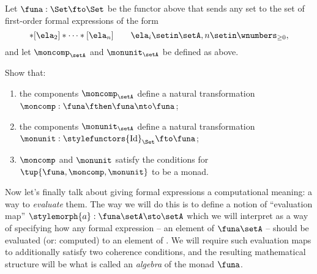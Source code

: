 \begin{gradedexercise}
    \label{ex:ListMonad}
    Let $\funa : \Set \fto \Set$ be the functor above that sends any set \setA to the set of first-order formal expressions of the form
    \begin{equation}
        [\ela_1]
        * [\ela_2] * \cdots * [\ela_n] \quad \quad \ela_i \setin \setA, n \setin \wnumbers_{\geq 0},
    \end{equation}
    and let $\moncomp_\setA$ and $\monunit_\setA$ be defined as above.

    Show that:
    \begin{enumerate}
        \item the components $\moncomp_\setA$ define a natural transformation $\moncomp : \funa \fthen \funa \nto \funa$;
        \item the components $\monunit_\setA$ define a natural transformation $\monunit : \stylefunctors{\text{Id}}_{\Set} \fto \funa$;
        \item $\moncomp$ and $\monunit$ satisfy the conditions for $\tup{\funa, \moncomp, \monunit}$ to be a monad.
    \end{enumerate}
\end{gradedexercise}


Now let's finally talk about giving formal expressions a computational meaning: a way to \emph{evaluate} them.
The way we will do this is to define a notion of ``evaluation map'' $\stylemorph{a}: \funa \setA \sto \setA$ which we will interpret as a way of specifying how any formal expression -- an element of $\funa \setA$ -- should be evaluated (or: computed) to an element of \setA.
We will require such evaluation maps to additionally satisfy two coherence conditions, and the resulting mathematical structure will be what is called an \emph{algebra} of the monad $\funa$.


